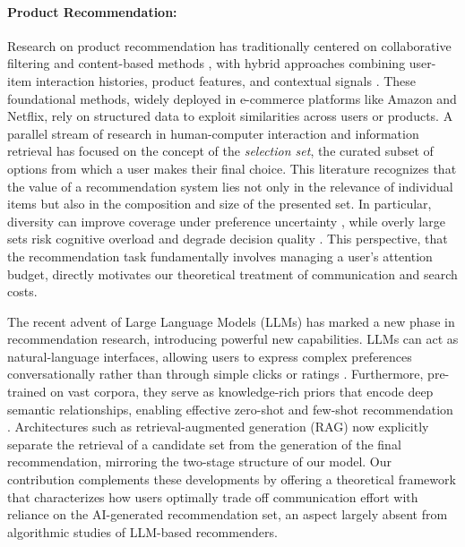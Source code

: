 \documentclass[12pt]{article}
\theoremstyle{definition}
\theoremstyle{remark}
\begin{document}
\paragraph{Product Recommendation:} Research on product recommendation has traditionally centered on collaborative filtering \citep{koren2021advances, su2009survey} and content-based methods \citep{thorat2015survey}, with hybrid approaches combining user-item interaction histories, product features, and contextual signals \citep{sarwar2001item, linden2003amazon}. These foundational methods, widely deployed in e-commerce platforms like Amazon and Netflix, rely on structured data to exploit similarities across users or products.
A parallel stream of research in human-computer interaction and information retrieval has focused on the concept of the \textit{selection set}, the curated subset of options from which a user makes their final choice. This literature recognizes that the value of a recommendation system lies not only in the relevance of individual items but also in the composition and size of the presented set. In particular, diversity can improve coverage under preference uncertainty \citep{ziegler2005improving}, while overly large sets risk cognitive overload and degrade decision quality \citep{iyengar2000choice}. This perspective, that the recommendation task fundamentally involves managing a user’s attention budget, directly motivates our theoretical treatment of communication and search costs.

The recent advent of Large Language Models (LLMs) has marked a new phase in recommendation research, introducing powerful new capabilities. LLMs can act as natural-language interfaces, allowing users to express complex preferences conversationally rather than through simple clicks or ratings \citep{zhang2023chatgpt}. Furthermore, pre-trained on vast corpora, they serve as knowledge-rich priors that encode deep semantic relationships, enabling effective zero-shot and few-shot recommendation \citep{bao2024large, wu2024survey}. Architectures such as retrieval-augmented generation (RAG) \citep{lewis2020retrieval} now explicitly separate the retrieval of a candidate set from the generation of the final recommendation, mirroring the two-stage structure of our model. Our contribution complements these developments by offering a theoretical framework that characterizes how users optimally trade off communication effort with reliance on the AI-generated recommendation set, an aspect largely absent from algorithmic studies of LLM-based recommenders.
\end{document}
